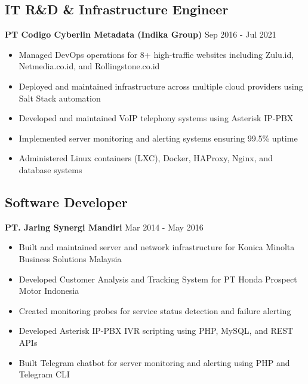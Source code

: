 \documentclass[11pt,a4paper]{article}
\newcommand{\company}[1]{\textbf{\color{primary}#1}}
\newcommand{\daterange}[1]{\color{secondary}#1}  %
\begin{document}
\subsection{IT R\&D \& Infrastructure Engineer}
\company{PT Codigo Cyberlin Metadata (Indika Group)} \hfill \daterange{Sep 2016 - Jul 2021}
\begin{itemize}[leftmargin=*, itemsep=2pt]
    \item Managed DevOps operations for 8+ high-traffic websites including Zulu.id, Netmedia.co.id, and Rollingstone.co.id
    \item Deployed and maintained infrastructure across multiple cloud providers using Salt Stack automation
    \item Developed and maintained VoIP telephony systems using Asterisk IP-PBX
    \item Implemented server monitoring and alerting systems ensuring 99.5\% uptime
    \item Administered Linux containers (LXC), Docker, HAProxy, Nginx, and database systems
\end{itemize}

\subsection{Software Developer}
\company{PT. Jaring Synergi Mandiri} \hfill \daterange{Mar 2014 - May 2016}
\begin{itemize}[leftmargin=*, itemsep=2pt]
    \item Built and maintained server and network infrastructure for Konica Minolta Business Solutions Malaysia
    \item Developed Customer Analysis and Tracking System for PT Honda Prospect Motor Indonesia
    \item Created monitoring probes for service status detection and failure alerting
    \item Developed Asterisk IP-PBX IVR scripting using PHP, MySQL, and REST APIs
    \item Built Telegram chatbot for server monitoring and alerting using PHP and Telegram CLI
\end{itemize}

\end{document}
